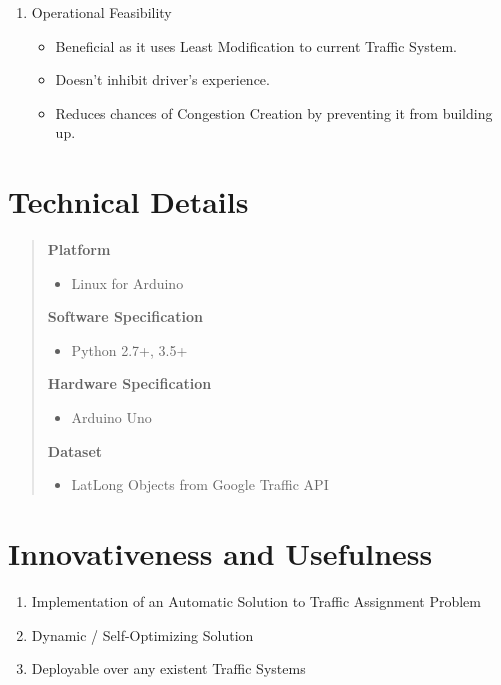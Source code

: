 \documentclass[12pt,a4paper,final]{article}
\begin{document}
\begin{flushleft}
\begin{enumerate}
\item 
Operational Feasibility\\
\begin{itemize}
\item Beneficial as it uses Least Modification to current Traffic System.\\
\item Doesn't inhibit driver's experience.\\
\item Reduces chances of Congestion Creation by preventing it from building up.\\
\end{itemize}
\end{enumerate}

\noindent
\section{Technical Details}
\begin{quotation}
\textbf{Platform}
\begin{itemize}

\item
Linux for Arduino

\end{itemize}

\textbf{Software Specification}
\begin{itemize}

\item
Python 2.7+, 3.5+

\end{itemize}

\textbf{Hardware Specification}
\begin{itemize}
\item
Arduino Uno
\end{itemize}

\textbf{Dataset}
\begin{itemize}
\item
LatLong Objects from Google Traffic API
\end{itemize}
\end{quotation}

\noindent
\section{Innovativeness and Usefulness}
\begin{enumerate}
\item
Implementation of an Automatic Solution to Traffic Assignment Problem
\item
Dynamic / Self-Optimizing Solution
\item
Deployable over any existent Traffic Systems
\end{enumerate}


\end{flushleft}
\end{document}
